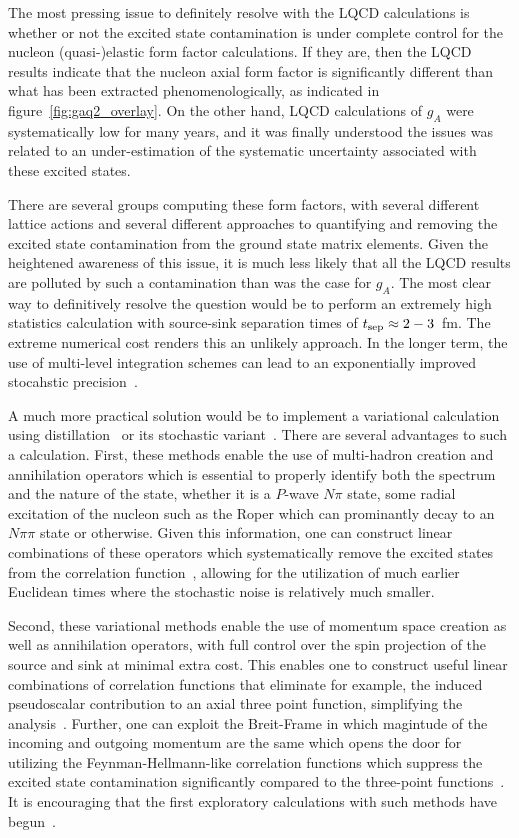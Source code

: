 The most pressing issue to definitely resolve with the LQCD calculations is whether or not the excited state contamination is under complete control for the nucleon (quasi-)elastic form factor calculations.
If they are, then the LQCD results indicate that the nucleon axial form factor is significantly different than what has been extracted phenomenologically, as indicated in figure~\ref{fig:gaq2_overlay}.
On the other hand, LQCD calculations of $g_A$ were systematically low for many years, and it was finally understood the issues was related to an under-estimation of the systematic uncertainty associated with these excited states.

There are several groups computing these form factors, with several different lattice actions and several different approaches to quantifying and removing the excited state contamination from the ground state matrix elements.
Given the heightened awareness of this issue, it is much less likely that all the LQCD results are polluted by such a contamination than was the case for $g_A$.
The most clear way to definitively resolve the question would be to perform an extremely high statistics calculation with source-sink separation times of $t_{\rm sep}\approx2-3$~fm.  The extreme numerical cost
renders this an unlikely approach.
In the longer term, the use of multi-level integration schemes can lead to an exponentially improved stocahstic precision~\cite{Ce:2016idq}.

A much more practical solution would be to implement a variational calculation using distillation~\cite{HadronSpectrum:2009krc} or its stochastic variant~\cite{Morningstar:2011ka}.
There are several advantages to such a calculation.
First, these methods enable the use of multi-hadron creation and annihilation operators which is essential to properly identify both the spectrum and the nature of the state, whether it is a $P$-wave $N\pi$ state, some radial excitation of the nucleon such as the Roper which can prominantly decay to an $N\pi\pi$ state or otherwise.
Given this information, one can construct linear combinations of these operators which systematically remove the excited states from the correlation function~\cite{Blossier:2009kd}, allowing for the utilization of much earlier Euclidean times where the stochastic noise is relatively much smaller.

Second, these variational methods enable the use of momentum space creation as well as annihilation operators, with full control over the spin projection of the source and sink at minimal extra cost.
This enables one to construct useful linear combinations of correlation functions that eliminate for example, the induced pseudoscalar contribution to an axial three point function, simplifying the analysis~\cite{Meyer:2017ddy}.
Further, one can exploit the Breit-Frame in which magintude of the incoming and outgoing momentum are the same which opens the door for utilizing the Feynman-Hellmann-like correlation functions which suppress the excited state contamination significantly compared to the three-point functions~\cite{He:2021yvm}.
It is encouraging that the first exploratory calculations with such methods have begun~\cite{Egerer:2018xgu,Barca:2021iak}.

